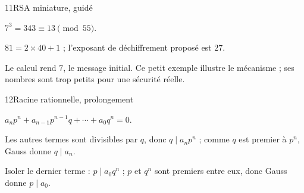 \begin{corrige}{11}{RSA miniature, guidé}
\begin{questions}
\item $7^3=343\equiv13\pmod{55}$.
\item $81=2\times40+1$ ; l’exposant de déchiffrement proposé est $27$.
\item Le calcul rend $7$, le message initial. Ce petit exemple illustre le mécanisme ; ses nombres sont trop petits pour une sécurité réelle.
\end{questions}
\end{corrige}
\begin{corrige}{12}{Racine rationnelle, prolongement}
\begin{questions}
\item $a_np^n+a_{n-1}p^{n-1}q+\cdots+a_0q^n=0$.
\item Les autres termes sont divisibles par $q$, donc $q\mid a_np^n$ ; comme $q$ est premier à $p^n$, Gauss donne $q\mid a_n$.
\item Isoler le dernier terme : $p\mid a_0q^n$ ; $p$ et $q^n$ sont premiers entre eux, donc Gauss donne $p\mid a_0$.
\end{questions}
\end{corrige}
